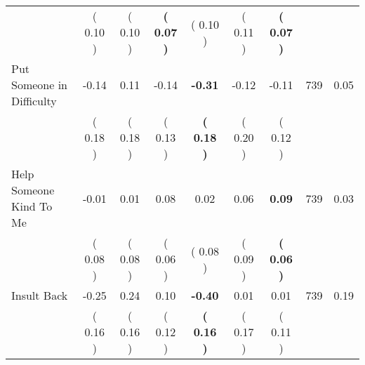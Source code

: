 \begin{tabular}{lcccccccc}
 & (     0.10 ) & (     0.10 ) & \textbf{(     0.07 )} & (     0.10 ) & (     0.11 ) & \textbf{(     0.07 )} & \\
Put Someone in Difficulty &     -0.14 &      0.11 &     -0.14 & \textbf{    -0.31} &     -0.12 &     -0.11 & 739 &       0.05 \\ 
 & (     0.18 ) & (     0.18 ) & (     0.13 ) & \textbf{(     0.18 )} & (     0.20 ) & (     0.12 ) & \\
Help Someone Kind To Me &     -0.01 &      0.01 &      0.08 &      0.02 &      0.06 & \textbf{     0.09} & 739 &       0.03 \\ 
 & (     0.08 ) & (     0.08 ) & (     0.06 ) & (     0.08 ) & (     0.09 ) & \textbf{(     0.06 )} & \\
Insult Back &     -0.25 &      0.24 &      0.10 & \textbf{    -0.40} &      0.01 &      0.01 & 739 &       0.19 \\ 
 & (     0.16 ) & (     0.16 ) & (     0.12 ) & \textbf{(     0.16 )} & (     0.17 ) & (     0.11 ) & \\
\bottomrule
\end{tabular}
